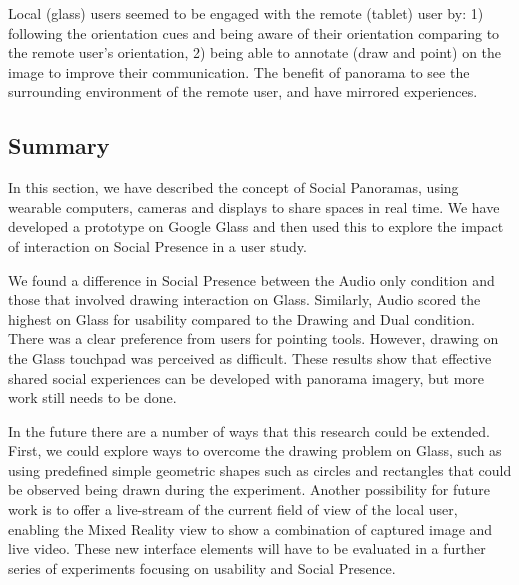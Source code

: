 Local (glass) users seemed to be engaged with the remote (tablet) user by: 1) following the orientation cues and being aware of their orientation comparing to the remote user's orientation, 2) being able to annotate (draw and point) on the image to improve their communication. The benefit of panorama to see the surrounding environment of the remote user, and have mirrored experiences.

\subsection{Summary}

In this section, we have described the concept of Social Panoramas, using wearable computers, cameras and displays to share spaces in real time. We have developed a prototype on Google Glass and then used this to explore the impact of interaction on Social Presence in a user study. 

We found a difference in Social Presence between the Audio only condition and those that involved drawing interaction on Glass. Similarly, Audio scored the highest on Glass for usability compared to the Drawing and Dual condition. There was a clear preference from users for pointing tools. However, drawing on the Glass touchpad was perceived as difficult. These results show that effective shared social experiences can be developed with panorama imagery, but more work still needs to be done.

In the future there are a number of ways that this research could be extended. First, we could explore ways to overcome the drawing problem on Glass, such as using predefined simple geometric shapes such as circles and rectangles that could be observed being drawn during the experiment. Another possibility for future work is to offer a live-stream of the current field of view of the local user, enabling the Mixed Reality view to show a combination of captured image and live video. These new interface elements will have to be evaluated in a further series of experiments focusing on usability and Social Presence.

